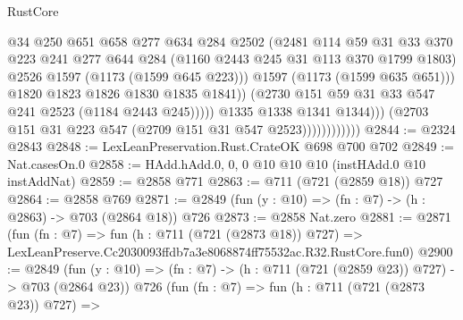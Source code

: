 \begin{lexlean}{RustCore}
\begin{coremodule}
                                          @34
                                          @250
                                          @651
                                          @658
                                          @277
                                          @634
                                          @284
                                          @2502
                                          (@2481
                                            @114
                                            @59
                                            @31
                                            @33
                                            @370
                                            @223
                                            @241
                                            @277
                                            @644
                                            @284
                                            (@1160 @2443 @245 @31 @113 @370 @1799 @1803)
                                            @2526
                                            @1597
                                            (@1173 (@1599 @645 @223)))
                                          @1597
                                          (@1173 (@1599 @635 @651)))
                                        @1820
                                        @1823
                                        @1826
                                        @1830
                                        @1835
                                        @1841))
                                    (@2730 @151 @59 @31 @33 @547 @241 @2523 (@1184 @2443 @245)))))
                              @1335
                              @1338
                              @1341
                              @1344)))
                        (@2703 @151 @31 @223 @547 (@2709 @151 @31 @547 @2523))))))))))))
@2844 := @2324 @2843
@2848 := LexLeanPreservation.Rust.CrateOK @698 @700 @702
@2849 := Nat.casesOn.{0}
@2858 := HAdd.hAdd.{0, 0, 0} @10 @10 @10 (instHAdd.{0} @10 instAddNat)
@2859 := @2858 @771
@2863 := @711 (@721 (@2859 @18)) @727
@2864 := @2858 @769
@2871 := @2849 (fun (y : @10) => (fn : @7) -> (h : @2863) -> @703 (@2864 @18)) @726
@2873 := @2858 Nat.zero
@2881 := @2871
    (fun (fn : @7) =>
    fun (h : @711 (@721 (@2873 @18)) @727) =>
    LexLeanPreserve.Cc2030093ffdb7a3e8068874ff75532ac.R32.RustCore.fun0)
@2900 := @2849
    (fun (y : @10) => (fn : @7) -> (h : @711 (@721 (@2859 @23)) @727) -> @703 (@2864 @23))
    @726
    (fun (fn : @7) =>
    fun (h : @711 (@721 (@2873 @23)) @727) =>

\end{coremodule}
\end{lexlean}
